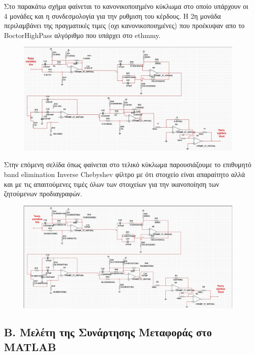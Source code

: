 \documentclass{article}
\begin{document}
{{\clearpage
\large{}
Στο παρακάτω σχήμα φαίνεται το κανονικοποιημένο κύκλωμα στο οποίο υπάρχουν οι 4 μονάδες και η συνδεσμολογία για την ρυθμιση του κέρδους. Η 2η μονάδα περιλαμβάνει της πραγματικές τιμες (οχι κανονικοποιημένες) που προέκυψαν απο το BoctorHighPass αλγόριθμο που υπάρχει στο ethmmy. 
\begin{figure}[h!]
\centering
 	\advance\leftskip-4cm
  \includegraphics[width=200mm,scale=2]{kanon_bandelim.jpg}
\end{figure} 
\clearpage
Στην επόμενη σελίδα όπως φαίνεται στο τελικό κύκλωμα παρουσιάζουμε το επιθυμητό band elimination Inverse Chebyshev φίλτρο με ότι στοιχείο είναι απαραίτητο αλλά και με τις απαιτούμενες τιμές όλων των στοιχείων για την ικανοποίηση των ζητούμενων προδιαγραφών.
\begin{figure}[h!]
\centering
 	\advance\leftskip-4cm
  \includegraphics[width=200mm,scale=2]{nokanon_bandelim.jpg}
\end{figure} 
\clearpage
\subsection*{B. Μελέτη της Συνάρτησης Μεταφοράς στο MATLAB}

}}
\end{document}
